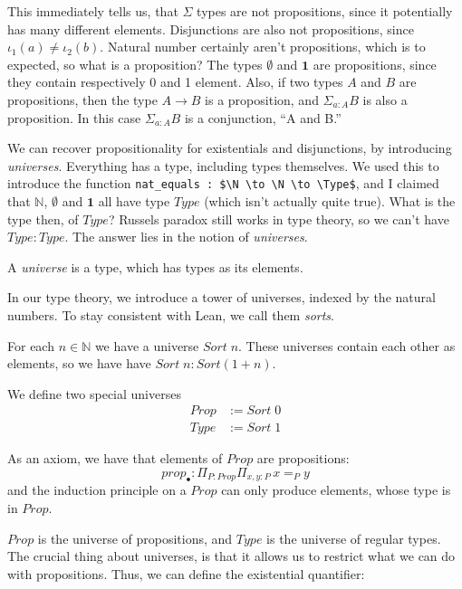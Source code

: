 \documentclass[a4paper, 12pt]{article}
\newcommand{\N}{\mathbb{N}}
\newcommand{\Prop}{\mathit{Prop}}
\newcommand{\Type}{\mathit{Type}}
\newcommand{\Sort}{\mathit{Sort\;}}
\renewcommand{\Prop}{\mathit{Prop}}
\theoremstyle{changedot}
\theoremstyle{changedotbreak}
\theoremstyle{nonumberplain}
\begin{document}
This immediately tells us, that $\Sigma$ types are not propositions, since it potentially has many different elements. Disjunctions are also not propositions, since $\iota_{1}(a) \neq \iota_{2}(b)$. Natural number certainly aren't propositions, which is to expected, so what is a proposition? The types $\emptyset$ and $\mathbf 1$ are propositions, since they contain respectively 0 and 1 element. Also, if two types $A$ and $B$ are propositions, then the type $A \to B$ is a proposition, and $\Sigma_{a:A}B$ is also a proposition. In this case $\Sigma_{a:A}B$ is a conjunction, ``A and B.''

We can recover propositionality for existentials and disjunctions, by introducing \textit{universes}. Everything has a type, including types themselves. We used this to introduce the function \lstinline{nat_equals : $\N \to \N \to \Type$}, and I claimed that $\N$, $\emptyset$ and $\mathbf 1$ all have type $\Type$ (which isn't actually quite true). What is the type then, of $\Type$? Russels paradox still works in type theory, so we can't have $\Type : \Type$. The answer lies in the notion of \textit{universes}.

\begin{definition}
  A \textit{universe} is a type, which has types as its elements.
\end{definition}

In our type theory, we introduce a tower of universes, indexed by the natural numbers. To stay consistent with Lean, we call them \textit{sorts}.

\begin{definition}
  For each $n \in \N$ we have a universe $\Sort n$. These universes contain each other as elements, so we have have $\Sort n : Sort(1+n)$.

  We define two special universes
  \begin{align*}
    \Prop &:= \Sort 0\\
    \Type &:= \Sort 1
  \end{align*}

  As an axiom, we have that elements of $\Prop$ are propositions:
  \[prop_{\bullet} : \Pi_{P:\Prop}\Pi_{x, y:P}\, x=_{P}y\]
  and the induction principle on a $\Prop$ can only produce elements, whose type is in $\Prop$.
\end{definition}

$\Prop$ is the universe of propositions, and $\Type$ is the universe of regular types. The crucial thing about universes, is that it allows us to restrict what we can do with propositions. Thus, we can define the existential quantifier:
\end{document}
